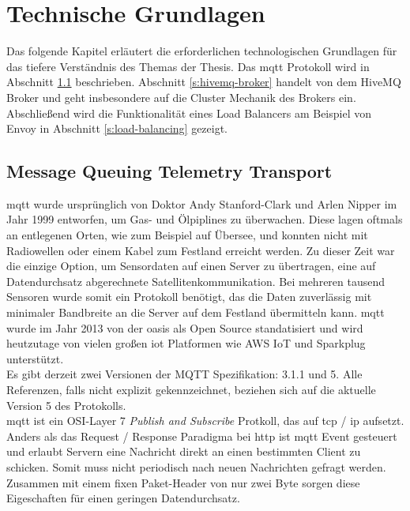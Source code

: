 \section{Technische Grundlagen} \label{s:basics}

Das folgende Kapitel erläutert die erforderlichen technologischen Grundlagen für das tiefere Verständnis des Themas der Thesis.
Das \acs{mqtt} Protokoll wird in Abschnitt \ref{s:mqtt} beschrieben.
Abschnitt \ref{s:hivemq-broker} handelt von dem HiveMQ Broker und geht insbesondere auf die Cluster Mechanik des Brokers ein.
Abschlie{\ss}end wird die Funktionalität eines Load Balancers am Beispiel von Envoy in Abschnitt \ref{s:load-balancing} gezeigt.

\subsection{Message Queuing Telemetry Transport} \label{s:mqtt}
\acf{mqtt} wurde ursprünglich von Doktor Andy Stanford-Clark und Arlen Nipper im Jahr 1999 entworfen, um Gas- und Ölpiplines zu überwachen. Diese lagen oftmals an entlegenen Orten, wie zum Beispiel auf Übersee, und konnten nicht mit Radiowellen oder einem Kabel zum Festland erreicht werden. Zu dieser Zeit war die einzige Option, um Sensordaten auf einen Server zu übertragen, eine auf Datendurchsatz abgerechnete Satellitenkommunikation. Bei mehreren tausend Sensoren wurde somit ein Protokoll benötigt, das die Daten zuverlässig mit minimaler Bandbreite an die Server auf dem Festland übermitteln kann.
\ac{mqtt} wurde im Jahr 2013 von der \ac{oasis} als Open Source standatisiert und wird heutzutage von vielen gro{\ss}en \ac{iot} Platformen wie AWS IoT und Sparkplug unterstützt.
\cite{WhatMQTTDefinition}\\
Es gibt derzeit zwei Versionen der MQTT Spezifikation: 3.1.1 und 5. Alle Referenzen, falls nicht explizit gekennzeichnet, beziehen sich auf die aktuelle Version 5 des Protokolls.\\
\ac{mqtt} ist ein OSI-Layer 7 \textit{Publish and Subscribe} Protkoll, das auf \acs{tcp} / \acs{ip} aufsetzt. Anders als das Request / Response Paradigma bei \acs{http} ist \ac{mqtt} Event gesteuert und erlaubt Servern eine Nachricht direkt an einen bestimmten Client zu schicken. Somit muss nicht periodisch nach neuen Nachrichten gefragt werden. Zusammen mit einem fixen Paket-Header von nur zwei Byte sorgen diese Eigeschaften für einen geringen Datendurchsatz.\cite{WhatMQTTDefinition}

